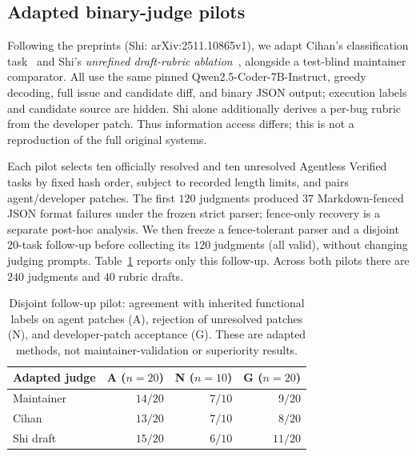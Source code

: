 \documentclass[10pt,conference]{IEEEtran}
\begin{document}
\begin{table}[t]
\centering
\caption{Across four agents spanning $2.8$--$53\%$ \%Resolved on Verified, adjusted Qwen results vary by reviewer. RAP is agent acceptance; each paired $p$ compares agent and gold on the same tasks. Qwen-32B detects differences for SWE-agent and OpenHands. RAG has low power.}
\label{tab:agents}
\small

\end{table}


\subsection{Adapted binary-judge pilots}
\label{sec:adapted}
Following the preprints (Shi: arXiv:2511.10865v1), we adapt Cihan's classification task~\cite{cihanreview} and Shi's
\emph{unrefined draft-rubric ablation}~\cite{hitlpatch}, alongside a test-blind maintainer
comparator. All use the same pinned Qwen2.5-Coder-7B-Instruct, greedy decoding, full issue
and candidate diff, and binary JSON output; execution labels and candidate source are
hidden. Shi alone additionally derives a per-bug rubric from the developer patch.
Thus information access differs; this is not a reproduction of the full original systems.

Each pilot selects ten officially resolved and ten unresolved Agentless Verified tasks by
fixed hash order, subject to recorded length limits, and pairs agent/developer patches.
The first $120$ judgments produced $37$ Markdown-fenced JSON format failures under the
frozen strict parser; fence-only recovery is a separate post-hoc analysis. We then freeze
a fence-tolerant parser and a disjoint $20$-task follow-up before collecting its $120$
judgments (all valid), without changing judging prompts. Table~\ref{tab:adapted} reports
only this follow-up. Across both pilots there are $240$ judgments and $40$ rubric drafts.

\begin{table}[t]
\centering
\caption{Disjoint follow-up pilot: agreement with inherited functional labels on agent
patches (A), rejection of unresolved patches (N), and developer-patch acceptance (G).
These are adapted methods, not maintainer-validation or superiority results.}
\label{tab:adapted}
\footnotesize
\begin{tabular}{lrrr}
\toprule
Adapted judge & A ($n=20$) & N ($n=10$) & G ($n=20$) \\
\midrule
Maintainer & $14/20$ & $7/10$ & $9/20$ \\
Cihan & $13/20$ & $7/10$ & $8/20$ \\
Shi draft & $15/20$ & $6/10$ & $11/20$ \\
\bottomrule
\end{tabular}
\end{table}
\end{document}
